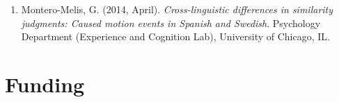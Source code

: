 \documentclass[margin, 11pt]{res} %
\begin{document}
\begin{resume}
\begin{enumerate}
\item Montero-Melis, G. (2014, April). \textit{Cross-linguistic differences in similarity judgments: Caused motion events in Spanish and Swedish}. Psychology Department (Experience and Cognition Lab), University of Chicago, IL.

\end{enumerate}



%
%
%
%
%
%
%




\section{\sc Funding}



\end{resume}
\end{document}
